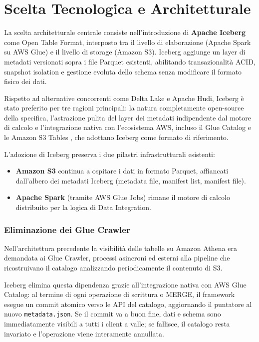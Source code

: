 \documentclass[12pt,a4paper,openright,twoside]{book}
\begin{document}
\newpage
\section{Scelta Tecnologica e Architetturale}

La scelta architetturale centrale consiste nell'introduzione di \textbf{Apache Iceberg} come Open Table Format, interposto tra il livello di elaborazione (Apache Spark su AWS Glue) e il livello di storage (Amazon S3). Iceberg aggiunge un layer di metadati versionati sopra i file Parquet esistenti, abilitando transazionalità ACID, snapshot isolation e gestione evoluta dello schema senza modificare il formato fisico dei dati.

Rispetto ad alternative concorrenti come Delta Lake e Apache Hudi, Iceberg è stato preferito per tre ragioni principali: la natura completamente open-source della specifica, l'astrazione pulita del layer dei metadati indipendente dal motore di calcolo e l'integrazione nativa con l'ecosistema AWS, incluso il Glue Catalog e le Amazon S3 Tables \cite{S3TablesDocs}, che adottano Iceberg come formato di riferimento.

L'adozione di Iceberg preserva i due pilastri infrastrutturali esistenti:

\begin{itemize}
    \item \textbf{Amazon S3} continua a ospitare i dati in formato Parquet, affiancati dall'albero dei metadati Iceberg (metadata file, manifest list, manifest file).
    \item \textbf{Apache Spark} (tramite AWS Glue Jobs) rimane il motore di calcolo distribuito per la logica di Data Integration.
\end{itemize}

\subsubsection{Eliminazione dei Glue Crawler}
Nell'architettura precedente la visibilità delle tabelle su Amazon Athena era demandata ai Glue Crawler, processi asincroni ed esterni alla pipeline che ricostruivano il catalogo analizzando periodicamente il contenuto di S3.

Iceberg elimina questa dipendenza grazie all'integrazione nativa con AWS Glue Catalog: al termine di ogni operazione di scrittura o MERGE, il framework esegue un commit atomico verso le API del catalogo, aggiornando il puntatore al nuovo \texttt{metadata.json}. Se il commit va a buon fine, dati e schema sono immediatamente visibili a tutti i client a valle; se fallisce, il catalogo resta invariato e l'operazione viene interamente annullata.
\end{document}
